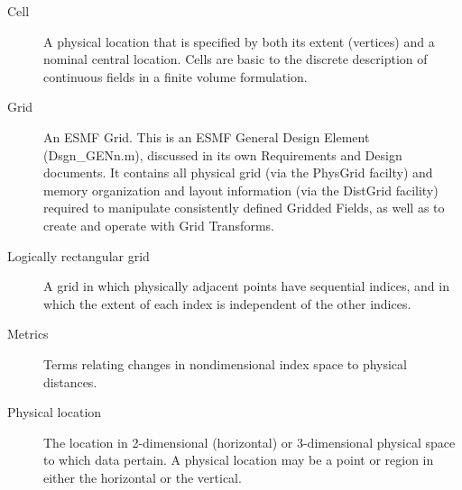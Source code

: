 
\begin{description}

\item [Cell] \label{glos:Cell} A physical location that is specified by both
its extent (vertices) and a nominal central location.  Cells are basic to the
discrete description of continuous fields in a finite volume formulation.

\item [Grid] An ESMF Grid. This is an ESMF General Design Element
(Dsgn\_GENn.m), discussed in its own Requirements and  Design documents. It
contains all physical grid (via the PhysGrid facilty) and memory organization
and layout information (via the DistGrid facility) required to manipulate
consistently defined Gridded Fields, as well as to create and operate with Grid
Transforms.

\item [Logically rectangular grid] \label{glos:RecGrid} A grid in which
physically adjacent points have sequential indices, and in which the extent of
each index is independent of the other indices.

\item [Metrics] \label{glos:Metrics} Terms relating changes in nondimensional
index space to physical distances.

\item [Physical location] \label{glos:PhysLoc} The location in 2-dimensional
(horizontal) or 3-dimensional physical space to which data pertain.  A
physical location may be a point or region in either the horizontal or the
vertical.

\end{description}



